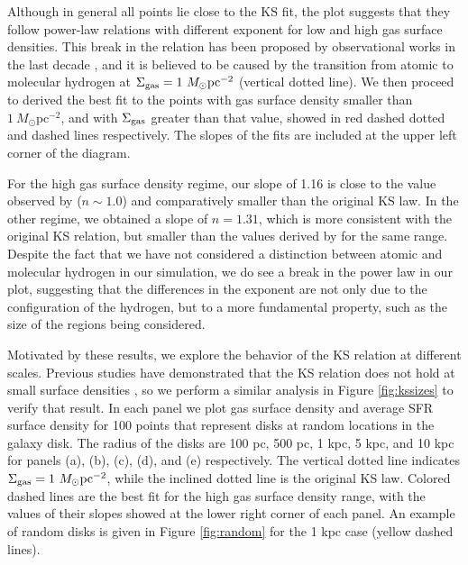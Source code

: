 \documentclass[twocolumn]{aastex}
\newcommand{\msun}{M_\odot}
\newcommand{\sgas}{\Sigma_{\rm gas}}
\begin{document}
	
Although in general all points lie close to the KS fit, the plot suggests that they follow power-law relations with different exponent for low and high gas surface densities. This break in the relation has been proposed by observational works in the last decade \citep{Bigiel_08}, and it is believed to be caused by the transition from atomic to molecular hydrogen at $\sgas = 1~\msun \text{pc}^{-2}$ (vertical dotted line). We then proceed to derived the best fit to the points with gas surface density smaller than $1~\msun \text{pc}^{-2}$, and with $\sgas$ greater than that value, showed in red dashed dotted and dashed lines respectively. The slopes of the fits are included at the upper left corner of the diagram. 

For the high gas surface density regime, our slope of 1.16 is close to the value observed by \citet{Bigiel_08} ($n \sim 1.0$) and comparatively smaller than the original KS law. In the other regime, we obtained a slope of $n = 1.31$, which is more consistent with the original KS relation, but smaller than the values derived by \citet{Bigiel_08} for the same range. Despite the fact that we have not considered a distinction between atomic and molecular hydrogen in our simulation, we do see a break in the power law in our plot, suggesting that the differences in the exponent are not only due to the configuration of the hydrogen, but to a more fundamental property, such as the size of the regions being considered. 

Motivated by these results, we explore the behavior of the KS relation at different scales. Previous studies have demonstrated that the KS relation does not hold at small surface densities \citep{Onodera_10, Verley_10}, so we perform a similar analysis in Figure \ref{fig:kssizes} to verify that result. In each panel we plot gas surface density and average SFR surface density for 100 points that represent disks at random locations in the galaxy disk. The radius of the disks are 100 pc, 500 pc, 1 kpc, 5 kpc, and 10 kpc for panels (a), (b), (c), (d), and (e) respectively. The vertical dotted line indicates $\sgas = 1~\msun \text{pc}^{-2}$, while the inclined dotted line is the original KS law. Colored dashed lines are the best fit for the high gas surface density range, with the values of their slopes showed at the lower right corner of each panel. An example of random disks is given in Figure \ref{fig:random} for the 1 kpc case (yellow dashed lines).
\end{document}
